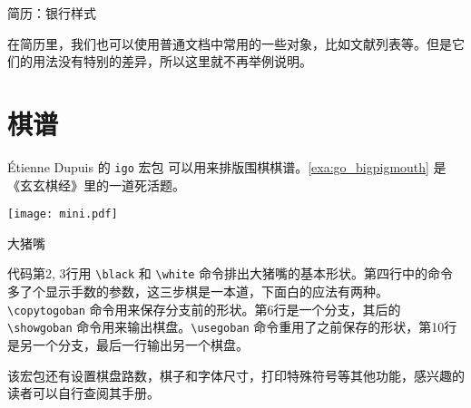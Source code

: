 \begin{example}[htbp]
\begin{Demo}
\centering
{}
\end{Demo}
\caption{简历：银行样式}
\label{exa:cv_banking}
\end{example}

在简历里，我们也可以使用普通文档中常用的一些对象，比如文献列表等。但是它们的用法没有特别的差异，所以这里就不再举例说明。

\section{棋谱}

Étienne Dupuis \indexDupuis 的 \texttt{igo} 宏包 \citep{Dupuis_igo} 可以用来排版围棋棋谱。\autoref{exa:go_bigpigmouth} 是《玄玄棋经》里的一道死活题。

\begin{example}[htbp]
\begin{FBTDemo}[numbers=left]{
\centering
\texttt{[image: mini.pdf]}
}
\usepackage{igo}
\showgoban
\quad
{}
\showgoban
\end{FBTDemo}
\caption{大猪嘴}
\label{exa:go_bigpigmouth}
\end{example}

代码第2, 3行用 \verb|\black| 和 \verb|\white| 命令排出大猪嘴的基本形状。第四行中的命令多了个显示手数的参数，这三步棋是一本道，下面白的应法有两种。\verb|\copytogoban| 命令用来保存分支前的形状。第6行是一个分支，其后的 \verb|\showgoban| 命令用来输出棋盘。\verb|\usegoban| 命令重用了之前保存的形状，第10行是另一个分支，最后一行输出另一个棋盘。

该宏包还有设置棋盘路数，棋子和字体尺寸，打印特殊符号等其他功能，感兴趣的读者可以自行查阅其手册。



